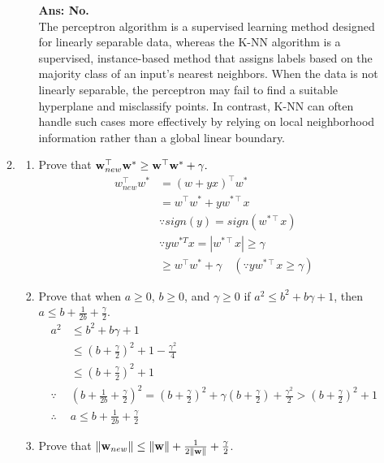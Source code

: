 \documentclass{article}
\theoremstyle{definition}
\theoremstyle{remark}
\begin{document}
\begin{enumerate}[font={\Large\bfseries},left=0pt]
\begin{tcolorbox}
\begin{enumerate}
\begin{enumerate}
            \textbf{Ans: No.} \\
          The perceptron algorithm is a supervised learning method designed for linearly separable data, whereas the K-NN algorithm is a supervised, instance-based method that assigns labels based on the majority class of an input’s nearest neighbors. When the data is not linearly separable, the perceptron may fail to find a suitable hyperplane and misclassify points. In contrast, K-NN can often handle such cases more effectively by relying on local neighborhood information rather than a global linear boundary.
        \end{enumerate}
        \item \begin{enumerate}
            \item Prove that ${\bf w}_{new}^\top{\bf w}^*\geq {\bf w}^\top{\bf w}^*+\gamma.$
            \begin{align}
              w_{new}^\intercal w^* &= (w + yx)^\intercal w^* \\
                                    &= w^{\intercal}w^* + yw^{*\intercal}x \\
                                    &\because sign(y) = sign(w^{*\intercal} x) \\
                                    &\because  yw^{*T}x = |w^{*\intercal}x| \ge \gamma \\
                                    &\ge w^\intercal w^* + \gamma \quad (\because yw^{*\intercal}x \ge \gamma)
            \end{align}
            \item Prove that when $a \ge 0$, $b \ge 0$, and $\gamma\ge 0$ if $a^2 \le b^2 + b\gamma + 1$, then $a \le b + \frac{1}{2b} + \frac{\gamma}{2}$.
            \begin{align}
                a^2 &\le b^2 + b\gamma + 1 \\
                    &\le (b + \frac{\gamma}{2})^2 + 1 - \frac{\gamma^2}{4} \\
                    &\le (b + \frac{\gamma}{2})^2 + 1 \\
                    \because &(b + \frac{1}{2b} + \frac{\gamma}{2})^2 = (b + \frac{\gamma}{2})^2 + \gamma(b + \frac{\gamma}{2}) + \frac{\gamma^2}{2} > (b + \frac{\gamma}{2})^2 + 1 \\
                    \therefore &a \le b + \frac{1}{2b} + \frac{\gamma}{2}
            \end{align}
            \item Prove that $\|{\bf w}_{new}\|\leq\|{\bf w}\|+\frac{1}{2\|{\bf w}\|}+\frac{\gamma}{2}$. \\

\end{enumerate}
\end{enumerate}
\end{tcolorbox}
\end{enumerate}
\end{document}

